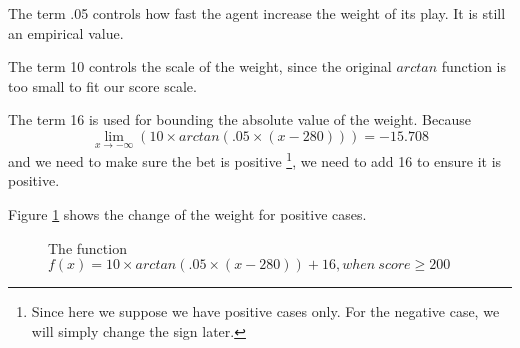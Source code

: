 \documentclass[10pt]{article}
\begin{document}
The term .05 controls how fast the agent increase the weight of its play. It is still an empirical value.

The term 10 controls the scale of the weight, since the original $arctan$ function is too small to fit our score scale.

The term 16 is used for bounding the absolute value of the weight. Because 
$$
\lim_{x \to -\infty} (10\times arctan(.05\times (x - 280))) = -15.708
$$ and we need to make sure the bet is positive \footnote{Since here we suppose we have positive cases only. For the negative case, we will simply change the sign later.}, we need to add 16 to ensure it is positive.

Figure \ref{figure:a} shows the change of the weight for positive cases.

\begin{figure}
\centering
{}
\caption{The function $f(x)=10\times arctan(.05\times (x - 280)) + 16, when\ score\geq 200$}
\label{figure:a}
\end{figure}


%
%
\end{document}
